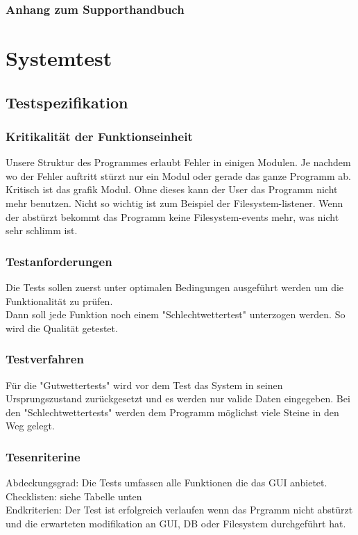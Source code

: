 \documentclass[10pt,paper=a4,final]{scrartcl}
\begin{document}
\subsubsection{Anhang zum Supporthandbuch}
\section{Systemtest}
\subsection{Testspezifikation}
\subsubsection{Kritikalit\"at der Funktionseinheit}
Unsere Struktur des Programmes erlaubt Fehler in einigen Modulen. Je nachdem wo der Fehler auftritt stürzt nur ein Modul oder gerade das ganze Programm ab. Kritisch ist das grafik Modul. Ohne dieses kann der User das Programm nicht mehr benutzen. Nicht so wichtig ist zum Beispiel der Filesystem-listener. Wenn der abstürzt bekommt das Programm keine Filesystem-events mehr, was nicht sehr schlimm ist.
\subsubsection{Testanforderungen}
Die Tests sollen zuerst unter optimalen Bedingungen ausgeführt werden um die Funktionalität zu prüfen.\\Dann soll jede Funktion noch einem "Schlechtwettertest" unterzogen werden. So wird die Qualität getestet.
\subsubsection{Testverfahren}
Für die "Gutwettertests" wird vor dem Test das System in seinen Ursprungszustand zurückgesetzt und es werden nur valide Daten eingegeben. Bei den "Schlechtwettertests" werden dem Programm möglichst viele Steine in den Weg gelegt.
\subsubsection{Tesenriterine}
Abdeckungsgrad: Die Tests umfassen alle Funktionen die das GUI anbietet.\\
Checklisten: siehe Tabelle unten\\
Endkriterien: Der Test ist erfolgreich verlaufen wenn das Prgramm nicht abstürzt und die erwarteten modifikation an GUI, DB oder Filesystem durchgeführt hat.\\
\end{document}

